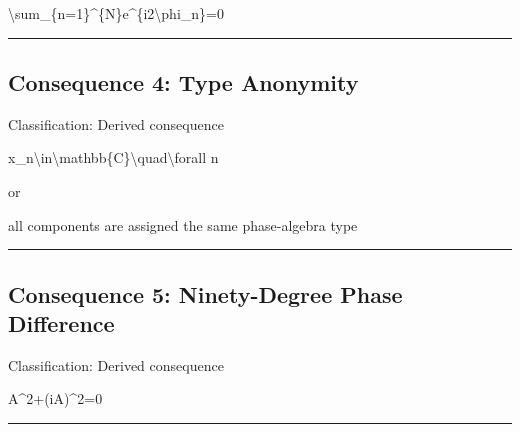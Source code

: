 \documentclass[
  a4paper]{article}
\newenvironment{Shaded}{}{}
\newcommand{\NormalTok}[1]{#1}
\begin{document}
\begin{Shaded}
\begin{Highlighting}[]
\NormalTok{\textbackslash{}sum\_\{n=1\}\^{}\{N\}e\^{}\{i2\textbackslash{}phi\_n\}=0}
\end{Highlighting}
\end{Shaded}

\begin{center}\rule{0.5\linewidth}{0.5pt}\end{center}

\subsection{Consequence 4: Type
Anonymity}\label{consequence-4-type-anonymity}

Classification: Derived consequence

\begin{Shaded}
\begin{Highlighting}[]
\NormalTok{x\_n\textbackslash{}in\textbackslash{}mathbb\{C\}\textbackslash{}quad\textbackslash{}forall n}
\end{Highlighting}
\end{Shaded}

or

\begin{Shaded}
\begin{Highlighting}[]
\NormalTok{all components are assigned the same phase{-}algebra type}
\end{Highlighting}
\end{Shaded}

\begin{center}\rule{0.5\linewidth}{0.5pt}\end{center}

\subsection{Consequence 5: Ninety-Degree Phase
Difference}\label{consequence-5-ninety-degree-phase-difference}

Classification: Derived consequence

\begin{Shaded}
\begin{Highlighting}[]
\NormalTok{A\^{}2+(iA)\^{}2=0}
\end{Highlighting}
\end{Shaded}

\begin{center}\rule{0.5\linewidth}{0.5pt}\end{center}
\end{document}
